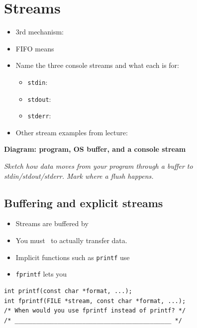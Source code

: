 \documentclass[12pt]{article}
\begin{document}
\section{Streams}

\begin{itemize}[leftmargin=*]
  \item 3rd mechanism: \hrulefill
  \item FIFO means \hrulefill
  \item Name the three console streams and what each is for:
  \begin{itemize}
    \item \texttt{stdin}: \hrulefill
    \item \texttt{stdout}: \hrulefill
    \item \texttt{stderr}: \hrulefill
  \end{itemize}
  \item Other stream examples from lecture: \hrulefill
\end{itemize}

\noindent\textbf{Diagram: program, OS buffer, and a console stream}
\begin{framed}
\begin{minipage}[t][0.28\textheight]{\textwidth}
\vspace{0.4em}
\textit{Sketch how data moves from your program through a buffer to stdin/stdout/stderr. Mark where a flush happens.}
\end{minipage}
\end{framed}

\subsection{Buffering and explicit streams}
\begin{itemize}[leftmargin=*]
  \item Streams are buffered by \hrulefill
  \item You must \hrulefill\ to actually transfer data.
  \item Implicit functions such as \texttt{printf} use \hrulefill
  \item \texttt{fprintf} lets you \hrulefill
\end{itemize}

\begin{lstlisting}
int printf(const char *format, ...);
int fprintf(FILE *stream, const char *format, ...);
/* When would you use fprintf instead of printf? */
/* ____________________________________________ */
\end{lstlisting}
\end{document}
